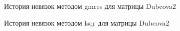 \begin{figure}
    \renewcommand{\figurename}{Рисунок}
    \caption{История невязок методом gmres для матрицы Dubcova2}
    \label{fig:image}
\end{figure}

\begin{figure}
    \renewcommand{\figurename}{Рисунок}
    \caption{История невязок методом lsqr для матрицы Dubcova2}
    \label{fig:image}
\end{figure}

